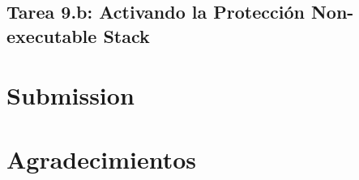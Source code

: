 \subsection{Tarea 9.b: Activando la Protección Non-executable Stack}





\section{Submission}




\section*{Agradecimientos}




